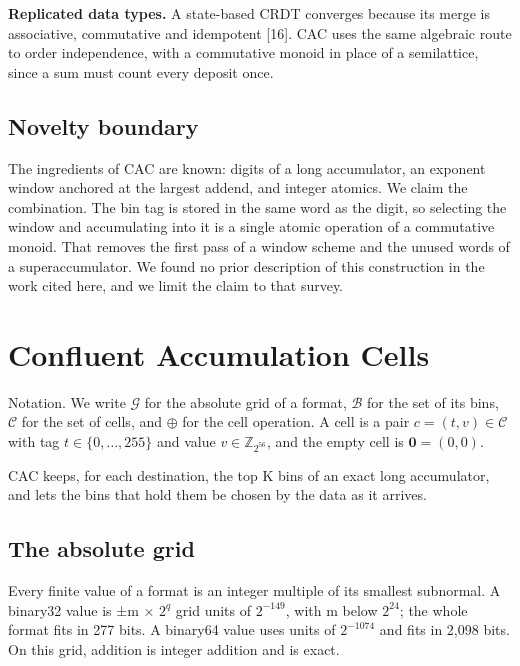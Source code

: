 \documentclass[journal]{IEEEtran}
\begin{document}
\textbf{Replicated data types.} A state-based CRDT converges because its
merge is associative, commutative and idempotent {[}16{]}. CAC uses the
same algebraic route to order independence, with a commutative monoid in
place of a semilattice, since a sum must count every deposit once.

\hypertarget{novelty-boundary}{%
\subsection{Novelty boundary}\label{novelty-boundary}}

The ingredients of CAC are known: digits of a long accumulator, an
exponent window anchored at the largest addend, and integer atomics. We
claim the combination. The bin tag is stored in the same word as the
digit, so selecting the window and accumulating into it is a single
atomic operation of a commutative monoid. That removes the first pass of
a window scheme and the unused words of a superaccumulator. We found no
prior description of this construction in the work cited here, and we
limit the claim to that survey.

\hypertarget{confluent-accumulation-cells}{%
\section{Confluent Accumulation
Cells}\label{confluent-accumulation-cells}}

Notation. We write \(\mathcal{G}\) for the absolute grid of a format,
\(\mathcal{B}\) for the set of its bins, \(\mathcal{C}\) for the set of
cells, and \(\oplus\) for the cell operation. A cell is a pair
\(c=(t,v)\in\mathcal{C}\) with tag \(t\in\{0,\dots,255\}\) and value
\(v\in\mathbb{Z}_{2^{56}}\), and the empty cell is \(\mathbf{0}=(0,0)\).

CAC keeps, for each destination, the top K bins of an exact long
accumulator, and lets the bins that hold them be chosen by the data as
it arrives.

\hypertarget{the-absolute-grid}{%
\subsection{The absolute grid}\label{the-absolute-grid}}

Every finite value of a format is an integer multiple of its smallest
subnormal. A binary32 value is ±m × \(2^q\) grid units of \(2^{-149}\),
with m below \(2^{24}\); the whole format fits in 277 bits. A binary64
value uses units of \(2^{-1074}\) and fits in 2,098 bits. On this grid,
addition is integer addition and is exact.
\end{document}

